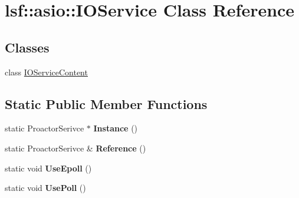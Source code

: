 \hypertarget{classlsf_1_1asio_1_1IOService}{
\section{lsf::asio::IOService Class Reference}
\label{classlsf_1_1asio_1_1IOService}
}
\subsection*{Classes}
\begin{DoxyCompactItemize}
\item 
class \hyperlink{classlsf_1_1asio_1_1IOService_1_1IOServiceContent}{IOServiceContent}
\end{DoxyCompactItemize}
\subsection*{Static Public Member Functions}
\begin{DoxyCompactItemize}
\item 
\hypertarget{classlsf_1_1asio_1_1IOService_a12e246738882eb0b19d5826da7c7e197}{
static ProactorSerivce $\ast$ {\bfseries Instance} ()}
\label{classlsf_1_1asio_1_1IOService_a12e246738882eb0b19d5826da7c7e197}

\item 
\hypertarget{classlsf_1_1asio_1_1IOService_a3243c6a8350cbfe62938eef04ebcda30}{
static ProactorSerivce \& {\bfseries Reference} ()}
\label{classlsf_1_1asio_1_1IOService_a3243c6a8350cbfe62938eef04ebcda30}

\item 
\hypertarget{classlsf_1_1asio_1_1IOService_a6d26e8b63283c1613b355bdff61cb58e}{
static void {\bfseries UseEpoll} ()}
\label{classlsf_1_1asio_1_1IOService_a6d26e8b63283c1613b355bdff61cb58e}

\item 
\hypertarget{classlsf_1_1asio_1_1IOService_a4e07f4ba20be9c1454efaa9b70b990ab}{
static void {\bfseries UsePoll} ()}
\label{classlsf_1_1asio_1_1IOService_a4e07f4ba20be9c1454efaa9b70b990ab}

\end{DoxyCompactItemize}
